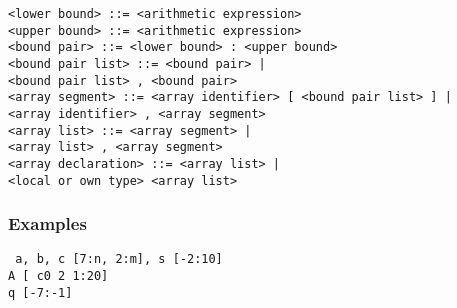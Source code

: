 \documentclass[a4paper,11pt]{article}
\begin{document}
\begin{flushleft}
\vspace{0.2em}\texttt{<lower bound> ::= <arithmetic expression>}\\

\vspace{0.2em}\texttt{<upper bound> ::= <arithmetic expression>}\\

\vspace{0.2em}\texttt{<bound pair> ::= <lower bound> : <upper bound>}\\

\vspace{0.2em}\texttt{<bound pair list> ::= <bound pair> |\\
  \hspace{1.0cm}<bound pair list> , <bound pair>}\\

\vspace{0.2em}\texttt{<array segment> ::= <array identifier> [ <bound pair list> ] |\\
  \hspace{1.0cm}<array identifier> , <array segment>}\\

\vspace{0.2em}\texttt{<array list> ::= <array segment> |\\
  \hspace{1.0cm}<array list> , <array segment>}\\

\vspace{0.2em}\texttt{<array declaration> ::=  <array list> |\\
  \hspace{1.0cm}<local or own type>  <array list>}\\
\end{flushleft}

\subsubsection{Examples}

\begin{flushleft}
\texttt{ a, b, c [7:n, 2:m], s [-2:10]\\
   A [ c\mlt{}0  2  1:20]\\
  q [-7:-1]}\\
\end{flushleft}
\end{document}
